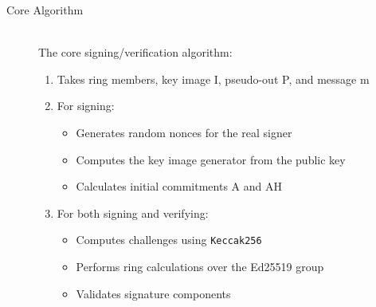 \documentclass[12pt,a4paper]{article}
\begin{document}
\begin{description}
\item[Core Algorithm] \hfill \\ %
The core signing/verification algorithm:
\begin{enumerate}
\item Takes ring members, key image I, pseudo-out P, and message m
\item For signing:
  \begin{itemize}
  \item Generates random nonces for the real signer
  \item Computes the key image generator from the public key
  \item Calculates initial commitments A and AH
  \end{itemize}
\item For both signing and verifying:
  \begin{itemize}
  \item Computes challenges using \texttt{Keccak256}
  \item Performs ring calculations over the Ed25519 group
  \item Validates signature components
  \end{itemize}
\end{enumerate}
\end{description}
\end{document}
